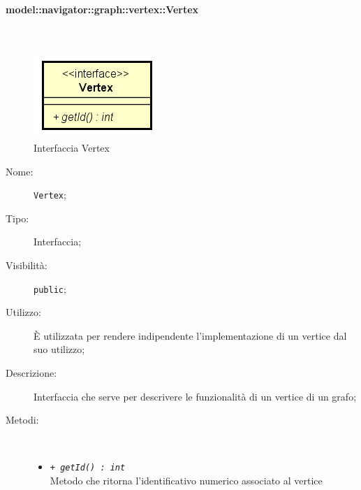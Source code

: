 \documentclass[../DefinizioneDiProdotto.tex]{subfiles}
\begin{document}
\paragraph{model::navigator::graph::vertex::Vertex}
\
\begin{figure}[H]
	\centering
	\includegraphics[width=\maxwidth]{img/Vertex.png}
	\caption{Interfaccia Vertex}\label{fig:model::navigator::graph::vertex::Vertex} 
\end{figure}
\begin{description}
	\item[Nome:] \texttt{Vertex};
	\item[Tipo:] Interfaccia;
	\item[Visibilità:] \texttt{public};
	\item[Utilizzo:] È utilizzata per rendere indipendente l'implementazione di un vertice dal suo utilizzo;
	\item[Descrizione:] Interfaccia che serve per descrivere le funzionalità di un vertice di un grafo;
	\item[Metodi:] \
	\begin{itemize}
		\item \texttt{+ \textit{getId() : int}}\\
		Metodo che ritorna l'identificativo numerico associato al vertice
	\end{itemize}
\end{description}
\end{document}
